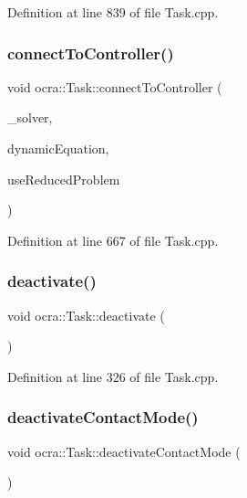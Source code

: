 Definition at line 839 of file Task.\+cpp.

\hypertarget{classocra_1_1Task_a38f7a4e8bcf2bd502c606f2b536b6f52}{}\label{classocra_1_1Task_a38f7a4e8bcf2bd502c606f2b536b6f52} 
\subsubsection{\texorpdfstring{connect\+To\+Controller()}{connectToController()}}
{\footnotesize\ttfamily void ocra\+::\+Task\+::connect\+To\+Controller (\begin{DoxyParamCaption}\item[{std\+::shared\+\_\+ptr$<$ \hyperlink{classocra_1_1OneLevelSolver}{One\+Level\+Solver} $>$}]{\+\_\+solver,  }\item[{const \hyperlink{classocra_1_1FullDynamicEquationFunction}{Full\+Dynamic\+Equation\+Function} \&}]{dynamic\+Equation,  }\item[{bool}]{use\+Reduced\+Problem }\end{DoxyParamCaption})}



Definition at line 667 of file Task.\+cpp.

\hypertarget{classocra_1_1Task_abb7309429225e72998ede63fdb2cc713}{}\label{classocra_1_1Task_abb7309429225e72998ede63fdb2cc713} 
\subsubsection{\texorpdfstring{deactivate()}{deactivate()}}
{\footnotesize\ttfamily void ocra\+::\+Task\+::deactivate (\begin{DoxyParamCaption}{ }\end{DoxyParamCaption})}



Definition at line 326 of file Task.\+cpp.

\hypertarget{classocra_1_1Task_a44fd1aaa1632247ea359af341958c956}{}\label{classocra_1_1Task_a44fd1aaa1632247ea359af341958c956} 
\subsubsection{\texorpdfstring{deactivate\+Contact\+Mode()}{deactivateContactMode()}}
{\footnotesize\ttfamily void ocra\+::\+Task\+::deactivate\+Contact\+Mode (\begin{DoxyParamCaption}{ }\end{DoxyParamCaption})}



